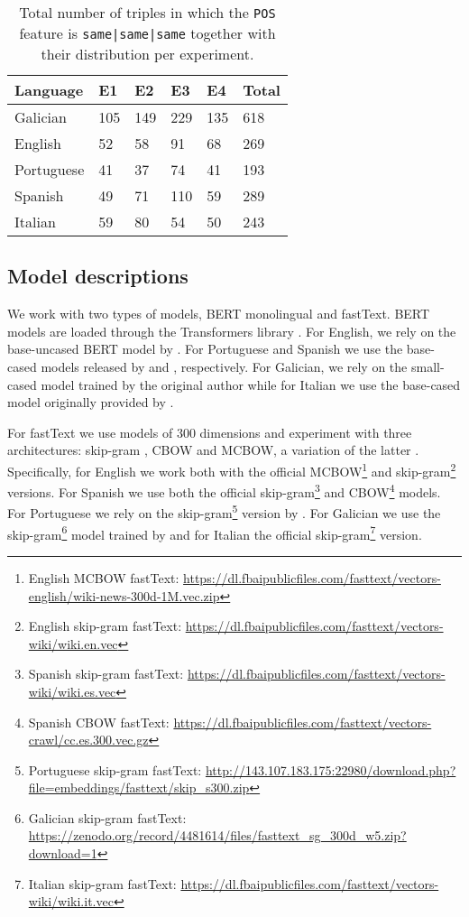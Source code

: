 \begin{table*}[ht]
    \centering
    \begin{tabularx}{\textwidth}{X|lllll}
        \hline
        \textbf{Language} & \textbf{E1} & \textbf{E2} & \textbf{E3} & \textbf{E4} & \textbf{Total} \\
        \hline
        Galician & 105 & 149 & 229 & 135 & 618 \\
        English & 52 & 58 & 91 & 68 & 269 \\
        Portuguese & 41 & 37 & 74 & 41 & 193 \\
        Spanish & 49 & 71 & 110 & 59 & 289 \\
        Italian & 59 & 80 & 54 & 50 & 243 \\
    \end{tabularx}
\caption{Total number of triples in which the \texttt{POS} feature is \texttt{same|same|same} together with their distribution per experiment.}\label{table:triples-distribution}
\end{table*}


\subsection{Model descriptions}
We work with two types of models, BERT monolingual and fastText. BERT models are loaded through the Transformers library \citep{transformers}. For English, we rely on the base-uncased BERT model by \citet{BERT:devlin2019}. For Portuguese and Spanish we use the base-cased models released by \citet{bertimbau} and \citet{beto}, respectively. For Galician, we rely on the small-cased model trained by the original author while for Italian we use the base-cased model originally provided by \citet{bertita}.

For fastText we use models of 300 dimensions and experiment with three architectures: skip-gram \citep{fasttext:bojanowski:2017}, CBOW \citep{fasttext:2018} and MCBOW, a variation of the latter \citep{fasttext:mcbow:2018}. Specifically, for English we work both with the official MCBOW\footnote{English MCBOW fastText: \url{https://dl.fbaipublicfiles.com/fasttext/vectors-english/wiki-news-300d-1M.vec.zip}} and skip-gram\footnote{English skip-gram fastText: \url{https://dl.fbaipublicfiles.com/fasttext/vectors-wiki/wiki.en.vec}} versions. For Spanish we use both the official skip-gram\footnote{Spanish skip-gram fastText: \url{https://dl.fbaipublicfiles.com/fasttext/vectors-wiki/wiki.es.vec}} and CBOW\footnote{Spanish CBOW fastText: \url{https://dl.fbaipublicfiles.com/fasttext/vectors-crawl/cc.es.300.vec.gz}} models. For Portuguese we rely on the skip-gram\footnote{Portuguese skip-gram fastText: \url{http://143.107.183.175:22980/download.php?file=embeddings/fasttext/skip_s300.zip}} version by \citet{fasttext:portuguese}. For Galician we use the skip-gram\footnote{Galician skip-gram fastText: \url{https://zenodo.org/record/4481614/files/fasttext_sg_300d_w5.zip?download=1}} model trained by \citet{garcia:acl} and for Italian the official skip-gram\footnote{Italian skip-gram fastText: \url{https://dl.fbaipublicfiles.com/fasttext/vectors-wiki/wiki.it.vec}} version.

